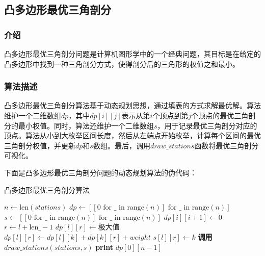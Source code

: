 \documentclass[lang=cn,11pt,a4paper]{elegantpaper}
\begin{document}
\subsection{凸多边形最优三角剖分}

\subsubsection{介绍}
凸多边形最优三角剖分问题是计算机图形学中的一个经典问题，其目标是在给定的凸多边形中找到一种三角剖分方式，使得剖分后的三角形的权值之和最小。

\subsubsection{算法描述}
凸多边形最优三角剖分算法基于动态规划思想，通过填表的方式求解最优解。算法维护一个二维数组$dp$，其中$dp[i][j]$表示从第$i$个顶点到第$j$个顶点的最优三角剖分的最小权值。同时，算法还维护一个二维数组$s$，用于记录最优三角剖分对应的顶点。算法从小到大枚举区间长度，然后从左端点开始枚举，计算每个区间的最优三角剖分权值，并更新$dp$和$s$数组。最后，调用$draw\_stations$函数将最优三角剖分可视化。



下面是凸多边形最优三角剖分问题的动态规划算法的伪代码：

\begin{algorithm}[H]
\caption{凸多边形最优三角剖分算法}
\begin{algorithmic}[1]
    \State $n \gets \text{len}(stations)$
    \State $dp \gets [[0 \text{ for } \_ \text{ in range}(n)] \text{ for } \_ \text{ in range}(n)]$ 
    \State $s \gets [[0 \text{ for } \_ \text{ in range}(n)] \text{ for } \_ \text{ in range}(n)]$ 
        \State $dp[i][i + 1] \gets 0$
    \EndFor
            \State $r \gets l + \text{len\_} - 1$
            \State $dp[l][r] \gets \text{极大值}$
                    \State $dp[l][r] \gets dp[l][k] + dp[k][r] + weight$
                    \State $s[l][r] \gets k$
                \EndIf
            \EndFor
        \EndFor
    \EndFor
    \State \textbf{调用} $draw\_stations(stations, s)$ 
    \State \textbf{print} $dp[0][n - 1]$
\EndProcedure
\end{algorithmic}
\end{algorithm}
\end{document}
